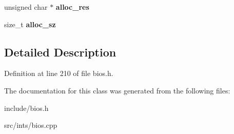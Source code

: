 \begin{DoxyCompactItemize}
\item 
\hypertarget{classISAPnPDevice_ab7645d92be95729a5f745d0735342296}{unsigned char $\ast$ {\bfseries alloc\-\_\-res}}\label{classISAPnPDevice_ab7645d92be95729a5f745d0735342296}

\item 
\hypertarget{classISAPnPDevice_ae872e27861732e57001057215332f53f}{size\-\_\-t {\bfseries alloc\-\_\-sz}}\label{classISAPnPDevice_ae872e27861732e57001057215332f53f}

\end{DoxyCompactItemize}


\subsection{Detailed Description}


Definition at line 210 of file bios.\-h.



The documentation for this class was generated from the following files\-:\begin{DoxyCompactItemize}
\item 
include/bios.\-h\item 
src/ints/bios.\-cpp\end{DoxyCompactItemize}
